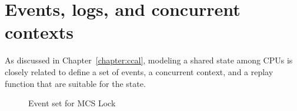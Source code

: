 %
%

\section{Events, logs, and concurrent contexts}
\label{subsec:eventlogandoracle}

As discussed in Chapter~\ref{chapter:ccal}, 
modeling a shared state among CPUs is 
closely related to define a set of events, a concurrent context, and a replay function that are suitable for
the state.


\begin{figure}
\begin{minipage}{\linewidth}

\end{minipage}
\caption{Event set for MCS Lock}
\label{fig:lock_event_type}
\end{figure}

